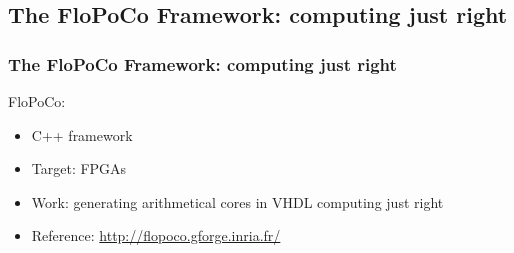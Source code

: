 

\subsection{The FloPoCo Framework: computing just right}
	\begin{frame}
		\frametitle{The FloPoCo Framework: computing just right}
		FloPoCo:\\
			\begin{itemize}
				\item C++ framework
				\item Target: FPGAs
				\item Work: generating arithmetical cores in VHDL computing just right
				\item Reference: \url{http://flopoco.gforge.inria.fr/}
			\end{itemize}
	\end{frame}


